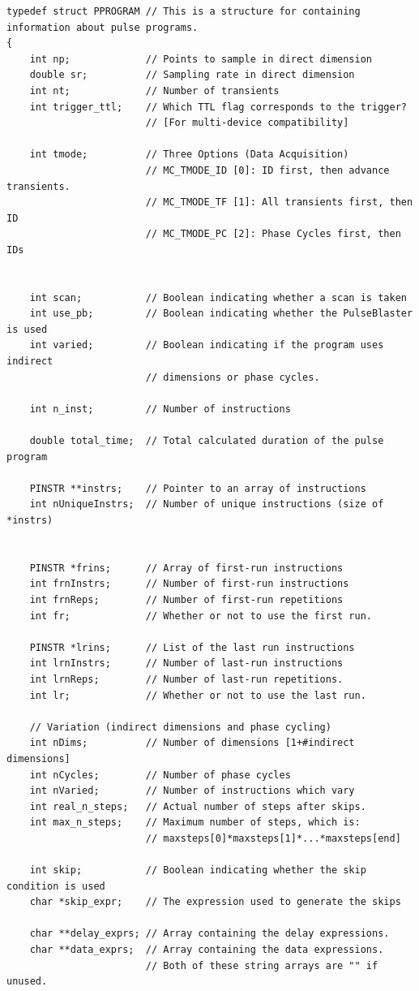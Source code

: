 \documentclass[PaulGanssle-Thesis.tex]{subfiles}
\begin{document}
\begin{lstlisting}[caption={The \texttt{PPROGRAM} structure used to store pulse programs.}, label={code:PPROG_struct}]
typedef struct PPROGRAM // This is a structure for containing information about pulse programs.
{
	int np; 			// Points to sample in direct dimension
	double sr; 			// Sampling rate in direct dimension
	int nt;				// Number of transients
	int trigger_ttl; 	// Which TTL flag corresponds to the trigger?
						// [For multi-device compatibility]
	
	int tmode;			// Three Options (Data Acquisition)
						// MC_TMODE_ID [0]: ID first, then advance transients.
						// MC_TMODE_TF [1]: All transients first, then ID
						// MC_TMODE_PC [2]: Phase Cycles first, then IDs
	
	
	int scan; 			// Boolean indicating whether a scan is taken
	int use_pb;			// Boolean indicating whether the PulseBlaster is used
	int varied; 		// Boolean indicating if the program uses indirect
						// dimensions or phase cycles.
	
	int n_inst;			// Number of instructions
	
	double total_time; 	// Total calculated duration of the pulse program
															  
	PINSTR **instrs; 	// Pointer to an array of instructions
	int nUniqueInstrs; 	// Number of unique instructions (size of *instrs)
	

	PINSTR *frins;		// Array of first-run instructions
	int frnInstrs;		// Number of first-run instructions
	int frnReps;		// Number of first-run repetitions
	int fr;				// Whether or not to use the first run.
	
	PINSTR *lrins;		// List of the last run instructions
	int lrnInstrs;		// Number of last-run instructions
	int lrnReps;		// Number of last-run repetitions.
	int lr;				// Whether or not to use the last run.
	
	// Variation (indirect dimensions and phase cycling)
	int nDims;		 	// Number of dimensions [1+#indirect dimensions]
	int nCycles; 		// Number of phase cycles
	int nVaried; 		// Number of instructions which vary
	int real_n_steps;	// Actual number of steps after skips.
	int max_n_steps;	// Maximum number of steps, which is:
						// maxsteps[0]*maxsteps[1]*...*maxsteps[end]

	int	skip;			// Boolean indicating whether the skip condition is used
	char *skip_expr;	// The expression used to generate the skips
	
	char **delay_exprs;	// Array containing the delay expressions.
	char **data_exprs;	// Array containing the data expressions.
						// Both of these string arrays are "" if unused.
	

\end{lstlisting}
\end{document}
